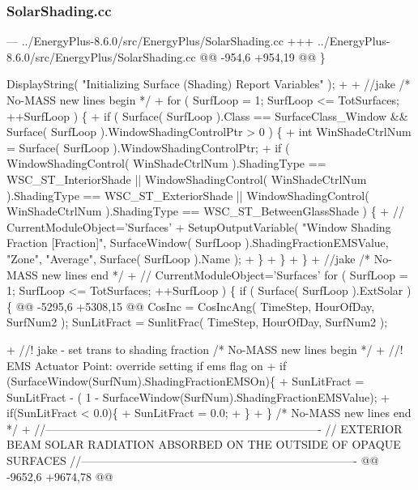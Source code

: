  

\subsubsection*{Solar\+Shading.\+cc}




\begin{DoxyCode}
--- ../EnergyPlus-8.6.0/src/EnergyPlus/SolarShading.cc
+++ ../EnergyPlus-8.6.0/src/EnergyPlus/SolarShading.cc
@@ -954,6 +954,19 @@
        \}

        DisplayString( "Initializing Surface (Shading) Report Variables" );
+
+       //jake /* No-MASS new lines begin */
+       for ( SurfLoop = 1; SurfLoop <= TotSurfaces; ++SurfLoop ) \{
+           if ( Surface( SurfLoop ).Class == SurfaceClass\_Window && Surface( SurfLoop
       ).WindowShadingControlPtr > 0 ) \{
+               int WinShadeCtrlNum = Surface( SurfLoop ).WindowShadingControlPtr;
+               if ( WindowShadingControl( WinShadeCtrlNum ).ShadingType == WSC\_ST\_InteriorShade ||
       WindowShadingControl( WinShadeCtrlNum ).ShadingType == WSC\_ST\_ExteriorShade || WindowShadingControl(
       WinShadeCtrlNum ).ShadingType == WSC\_ST\_BetweenGlassShade ) \{
+                       // CurrentModuleObject='Surfaces'
+                       SetupOutputVariable( "Window Shading Fraction [Fraction]", SurfaceWindow( SurfLoop
       ).ShadingFractionEMSValue, "Zone", "Average", Surface( SurfLoop ).Name );
+               \}
+           \}
+       \}
+       //jake /* No-MASS new lines end */
+
        // CurrentModuleObject='Surfaces'
        for ( SurfLoop = 1; SurfLoop <= TotSurfaces; ++SurfLoop ) \{
            if ( Surface( SurfLoop ).ExtSolar ) \{
@@ -5295,6 +5308,15 @@
                CosInc = CosIncAng( TimeStep, HourOfDay, SurfNum2 );
                SunLitFract = SunlitFrac( TimeStep, HourOfDay, SurfNum2 );

+               //! jake - set trans to shading fraction /* No-MASS new lines begin */
+               //! EMS Actuator Point: override setting if ems flag on
+               if (SurfaceWindow(SurfNum).ShadingFractionEMSOn)\{
+                       SunLitFract = SunLitFract - ( 1 - SurfaceWindow(SurfNum).ShadingFractionEMSValue);
+                       if(SunLitFract < 0.0)\{
+                           SunLitFract = 0.0;
+                       \}
+               \} /* No-MASS new lines end */
+
                //-------------------------------------------------------------------------
                // EXTERIOR BEAM SOLAR RADIATION ABSORBED ON THE OUTSIDE OF OPAQUE SURFACES
                //-------------------------------------------------------------------------
@@ -9652,6 +9674,78 @@


\end{DoxyCode}
